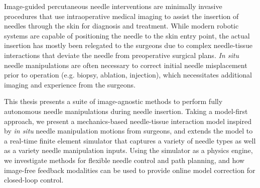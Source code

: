 


Image-guided percutaneous needle interventions are minimally invasive procedures that use intraoperative medical imaging to assist the insertion of needles through the skin for diagnosis and treatment. While modern robotic systems are capable of positioning the needle to the skin entry point, the actual insertion has mostly been relegated to the surgeons due to complex needle-tissue interactions that deviate the needle from preoperative surgical plans. \textit{In situ} needle manipulations are often necessary to correct initial needle misplacement prior to operation (e.g. biopsy, ablation, injection), which necessitates additional imaging and experience from the surgeons.

This thesis presents a suite of image-agnostic methods to perform fully autonomous needle manipulations during needle insertion. Taking a model-first approach, we present a mechanics-based needle-tissue interaction model inspired by \textit{in situ} needle manipulation motions from surgeons, and extends the model to a real-time finite element simulator that captures a variety of needle types as well as a variety needle manipulation inputs. Using the simulator as a physics engine, we investigate methods for flexible needle control and path planning, and how image-free feedback modalities can be used to provide online model correction for closed-loop control.



